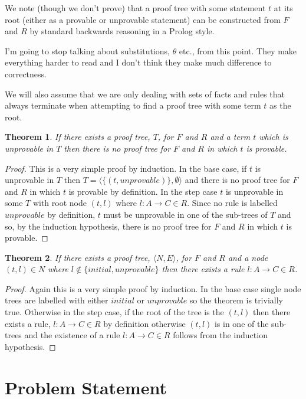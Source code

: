 \documentclass{blue-book}
\newtheorem{theorem}{Theorem}
\newcommand{\drule}[3]{\ensuremath{#1:#2 \rightarrow #3}}
\newcommand{\pt}[2]{\ensuremath{\langle #1,#2 \rangle}}
\newcommand{\node}[2]{\ensuremath{(#1, #2)}}
\begin{document}
We note (though we don't prove) that a proof tree with some statement $t$ at its root (either as a provable or unprovable statement) can be constructed from $F$ and $R$ by standard backwards reasoning in a Prolog style.

I'm going to stop talking about substitutions, $\theta$ etc., from this point.  They make everything harder to read and I don't think they make much difference to correctness.  

We will also assume that we are only dealing with sets of facts and rules that always terminate when attempting to find a proof tree with some term $t$ as the root.

\begin{theorem}
\label{thm:unprovable}
If there exists a proof tree, $T$, for $F$ and $R$ and a term $t$ which is unprovable in $T$ then there is no proof tree for $F$ and $R$ in which $t$ is provable.
\end{theorem}
\begin{proof}
This is a very simple proof by induction.  In the base case, if $t$ is unprovable in $T$ then $T = \pt{\{\node{t}{unprovable} \}}{\emptyset}$ and there is no proof tree for $F$ and $R$ in which $t$ is provable by definition.  In the step case $t$ is unprovable in some $T$ with root node $\node{t}{l}$ where $\drule{l}{A}{C} \in R$.  Since no rule is labelled $unprovable$ by definition, $t$ must be unprovable in one of the sub-trees of $T$ and so, by the induction hypothesis, there is no proof tree for $F$ and $R$ in which $t$ is provable.
\end{proof}
\begin{theorem}
\label{thm:rules}
If there exists a proof tree, $\pt{N}{E}$, for $F$ and $R$ and a node $\node{t}{l} \in N$ where $l \not\in \{initial,unprovable\}$ then there exists a rule $\drule{l}{A}{C} \in R$.
\end{theorem}
\begin{proof}
Again this is a very simple proof by induction.  In the base case single node trees are labelled with either $initial$ or $unprovable$ so the theorem is trivially true.  Otherwise in the step case, if the root of the tree is the $\node{t}{l}$ then there exists a rule, $\drule{l}{A}{C} \in R$ by definition otherwise $\node{t}{l}$ is in one of the sub-trees and the existence of a rule $\drule{l}{A}{C} \in R$  follows from the induction hypothesis.
\end{proof}
\section{Problem Statement}
\end{document}
